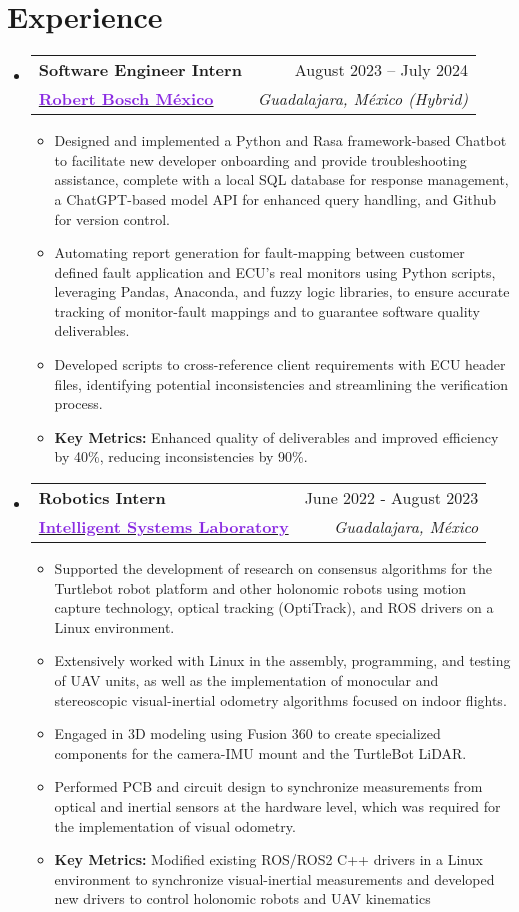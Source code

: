 \documentclass[a4paper,11pt]{article}
\makeatletter
\newcommand{\resumeItem}[1]{
  \item\small{
    {#1 \vspace{-2pt}}
  }
}
\newcommand{\resumeItemNoBullet}[1]{
  \item[]\small{
    {#1 \vspace{-2pt}}
  }
}
\newcommand{\resumeSubheadingNoItalics}[4]{
  \vspace{-2pt}\item
    \begin{tabular*}{1\textwidth}[t]{l@{\extracolsep{\fill}}r}
      \textbf{#1} & #2 \\
      \small#3 & \textit{\small #4} \\
    \end{tabular*}\vspace{-2pt}
}
\newcommand{\resumeSubHeadingListStart}{\begin{itemize}[leftmargin=0in, label={}]}
\newcommand{\resumeSubHeadingListEnd}{\end{itemize}}
\newcommand{\resumeItemListStart}{\begin{itemize}[leftmargin=0.15in, nosep]}
\newcommand{\resumeItemListEnd}{\end{itemize}\vspace{-2pt}}
\makeatother
\begin{document}
\section{\Large{Experience}}
  \resumeSubHeadingListStart
    \resumeSubheadingNoItalics
      {\large Software Engineer Intern}{August 2023 -- July 2024}
      {\href{https://bosch.com.mx}{\textcolor{BlueViolet}{\textbf{\large{Robert Bosch México}}}}}{Guadalajara, México (Hybrid)}
      \resumeItemListStart
        \resumeItem{Designed and implemented a Python and Rasa framework-based Chatbot to facilitate new developer onboarding and provide troubleshooting assistance, complete with a local SQL database for response management, a ChatGPT-based model API for enhanced query handling, and Github for version control.}
        \resumeItem{Automating report generation for fault-mapping between customer defined fault application and ECU's  real monitors using Python scripts, leveraging Pandas, Anaconda, and fuzzy logic libraries, to ensure accurate tracking of monitor-fault mappings and to guarantee software quality deliverables.}
        \resumeItem{Developed scripts to cross-reference client requirements with ECU header files, identifying potential inconsistencies and streamlining the verification process.}
        \resumeItemNoBullet{\textbf{Key Metrics:} Enhanced quality of deliverables and improved efficiency by 40\%, reducing inconsistencies by 90\%.}
      \resumeItemListEnd
    \vspace{-2pt}
    \resumeSubheadingNoItalics
      {\large Robotics Intern}{June 2022 - August 2023}
      {\href{https://www.cucei.udg.mx/carreras/robotica/es/laboratorios/ciber-fisicos}{\textcolor{BlueViolet}{\textbf{\large{Intelligent Systems Laboratory}}}}}{Guadalajara, México}
      \resumeItemListStart
        \resumeItem{Supported the development of research on consensus algorithms for the Turtlebot robot platform and other holonomic robots using motion capture technology, optical tracking (OptiTrack), and ROS drivers on a Linux environment.}
        \resumeItem{Extensively worked with Linux in the assembly, programming, and testing of UAV units, as well as the implementation of monocular and stereoscopic visual-inertial odometry algorithms focused on indoor flights.}
        \resumeItem{Engaged in 3D modeling using Fusion 360 to create specialized components for the camera-IMU mount and the TurtleBot LiDAR.}
        \resumeItem{Performed PCB and circuit design to synchronize measurements from optical and inertial sensors at the hardware level, which was required for the implementation of visual odometry.}
        \resumeItemNoBullet{\textbf{Key Metrics:} Modified existing ROS/ROS2 C++ drivers in a Linux environment to synchronize visual-inertial measurements and developed new drivers to control holonomic robots and UAV kinematics}
      \resumeItemListEnd
  \resumeSubHeadingListEnd
\vspace{-12pt}
\end{document}
